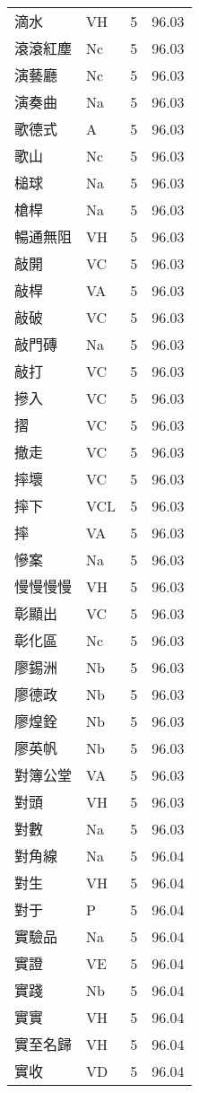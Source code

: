 \documentclass[twocolumn]{book}
\begin{document}
\begin{supertabular}{llrr}
滴水 & VH & 5 &  96.03\\
滾滾紅塵 & Nc & 5 &  96.03\\
演藝廳 & Nc & 5 &  96.03\\
演奏曲 & Na & 5 &  96.03\\
歌德式 & A & 5 &  96.03\\
歌山 & Nc & 5 &  96.03\\
槌球 & Na & 5 &  96.03\\
槍桿 & Na & 5 &  96.03\\
暢通無阻 & VH & 5 &  96.03\\
敲開 & VC & 5 &  96.03\\
敲桿 & VA & 5 &  96.03\\
敲破 & VC & 5 &  96.03\\
敲門磚 & Na & 5 &  96.03\\
敲打 & VC & 5 &  96.03\\
摻入 & VC & 5 &  96.03\\
摺 & VC & 5 &  96.03\\
撤走 & VC & 5 &  96.03\\
摔壞 & VC & 5 &  96.03\\
摔下 & VCL & 5 &  96.03\\
摔 & VA & 5 &  96.03\\
慘案 & Na & 5 &  96.03\\
慢慢慢慢 & VH & 5 &  96.03\\
彰顯出 & VC & 5 &  96.03\\
彰化區 & Nc & 5 &  96.03\\
廖錫洲 & Nb & 5 &  96.03\\
廖德政 & Nb & 5 &  96.03\\
廖煌銓 & Nb & 5 &  96.03\\
廖英帆 & Nb & 5 &  96.03\\
對簿公堂 & VA & 5 &  96.03\\
對頭 & VH & 5 &  96.03\\
對數 & Na & 5 &  96.03\\
對角線 & Na & 5 &  96.04\\
對生 & VH & 5 &  96.04\\
對于 & P & 5 &  96.04\\
實驗品 & Na & 5 &  96.04\\
實證 & VE & 5 &  96.04\\
實踐 & Nb & 5 &  96.04\\
實實 & VH & 5 &  96.04\\
實至名歸 & VH & 5 &  96.04\\
實收 & VD & 5 &  96.04\\

\end{supertabular}
\end{document}
